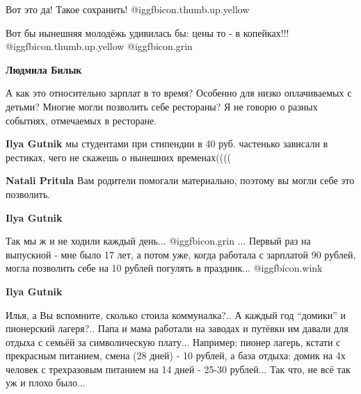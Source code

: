  
 
 
 
 

Вот это да! Такое сохранить! @igg{fbicon.thumb.up.yellow} 


Вот бы нынешняя молодёжь удивилась бы: цены то - в копейках!!!
@igg{fbicon.thumb.up.yellow}  @igg{fbicon.grin} 

\textbf{Людмила Билык} 

А как это относительно зарплат в то время? Особенно для низко оплачиваемых с
детьми? Многие могли позволить себе рестораны? Я не говорю о разных событиях,
отмечаемых в ресторане.

\textbf{Ilya Gutnik} мы студентами при стипендии в 40 руб. частенько зависали в рестиках, чего не скажешь о нынешних временах((((

\textbf{Natali Pritula} Вам родители помогали материально, поэтому вы могли себе это позволить.

\textbf{Ilya Gutnik} 

Так мы ж и не ходили каждый день...  @igg{fbicon.grin} ... Первый раз на выпускной - мне было 17
лет, а потом уже, когда работала с зарплатой 90 рублей, могла позволить себе на
10 рублей погулять в праздник...  @igg{fbicon.wink}  

\textbf{Ilya Gutnik} 

Илья, а Вы вспомните, сколько стоила коммуналка?.. А каждый год \enquote{домики} и
пионерский лагеря?.. Папа и мама работали на заводах и путёвки им давали для
отдыха с семьёй за символическую плату... Например: пионер лагерь, кстати с
прекрасным питанием, смена (28 дней) - 10 рублей, а база отдыха: домик на 4х
человек с трехразовым питанием на 14 дней - 25-30 рублей... Так что, не всё так
уж и плохо было...
